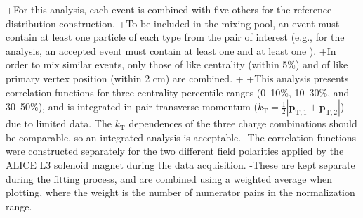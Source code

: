 +For this analysis, each event is combined with five others for the reference distribution construction.
+To be included in the mixing pool, an event must contain at least one particle of each type from the pair of interest (e.g., for the \LamKs analysis, an accepted event must contain at least one \Lam and at least one \Ks).
+In order to mix similar events, only those of like centrality (within 5\%) and of like primary vertex position (within 2 cm) are combined.
+
+This analysis presents correlation functions for three centrality percentile ranges (0--10\%, 10--30\%, and 30--50\%), and is integrated in pair transverse momentum ($k_{\mathrm{T}} = \frac{1}{2}|\mathbf{p}_{\mathrm{T,1}}+\mathbf{p}_{\mathrm{T,2}}|$) due to limited data.
 The $k_{\mathrm{T}}$ dependences of the three \LamK charge combinations should be comparable, so an integrated analysis is acceptable.
-The correlation functions were constructed separately for the two different field polarities applied by the ALICE L3 solenoid magnet during the data acquisition.
-These are kept separate during the fitting process, and are combined using a weighted average when plotting, where the weight is the number of numerator pairs in the normalization range.
 
